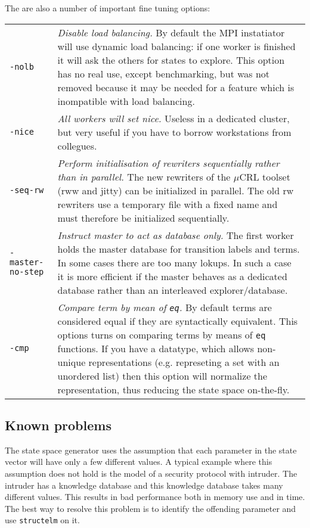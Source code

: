 \documentclass{cwiarticle}
\begin{document}
The are also a number of important fine tuning options:
\\\begin{tabularx}{\textwidth}{lX}
\verb+-nolb+  & {\em Disable load balancing.} By default the MPI instatiator will use dynamic load balancing:
if one worker is finished it will ask the others for states to explore. This option has no real use, except
benchmarking, but was not removed because
it may be needed for a feature which is inompatible with load balancing.
\\
\verb+-nice+ & {\em All workers will set nice.} Useless in a dedicated cluster, but very useful
if you have to borrow workstations from collegues.
\\
\verb+-seq-rw+ & {\em Perform initialisation of rewriters sequentially
                 rather than in parallel.} The new rewriters of the $\mu$CRL toolset (rww and jitty) can be initialized in parallel. The old rw rewriters use a temporary file with a fixed name and must therefore be initialized sequentially.
\\
\verb+-master-no-step+ & {\em Instruct master to act as database only.}
The first worker holds the master database for transition labels and terms. In some cases
there are too many lokups. In such a case it is more efficient if the master behaves as a dedicated database
rather than an interleaved explorer/database.
\\
\verb+-cmp+ & {\em Compare term by mean of \verb+eq+.} By default terms are considered equal if
they are syntactically equivalent. This options turns on comparing terms by means of \verb+eq+ functions.
If you have a datatype, which allows non-unique representations (e.g. represeting a set with an unordered list) then this option will normalize the representation, thus reducing the state space on-the-fly.
\end{tabularx}

\subsection*{Known problems}

The state space generator uses the assumption that each parameter in the state vector
will have only a few different values. A typical example where this assumption does not hold
is the model of a security protocol with intruder. The intruder has a knowledge database
and this knowledge database takes many different values. This results in bad performance
both in memory use and in time. The best way to resolve this problem is to
identify the offending parameter and use \verb+structelm+ on it.
\end{document}
